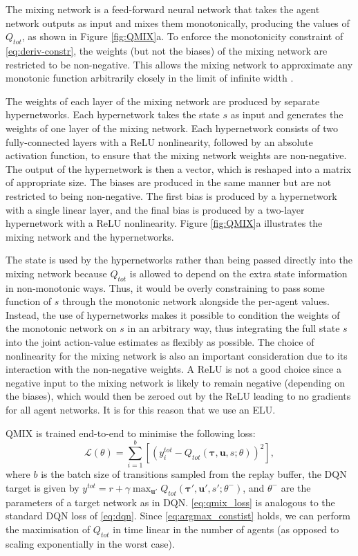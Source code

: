 \documentclass[twoside,11pt]{article}
\begin{document}
The mixing network is a feed-forward neural network that takes the agent 
network outputs as input and mixes them monotonically, producing the values of 
$Q_{tot}$, as shown in Figure \ref{fig:QMIX}a. To enforce the monotonicity 
constraint of \eqref{eq:deriv-constr}, the weights (but not the biases) of the 
mixing network are restricted to be non-negative. This allows the mixing 
network to approximate any monotonic function arbitrarily closely in the limit 
of infinite width \citep{Dugas_2009}.


The weights of each layer of the mixing network are produced by separate 
hypernetworks. Each hypernetwork takes the state $s$ as input and generates the 
weights of one layer of the mixing network. 
Each hypernetwork consists of two fully-connected layers with a ReLU nonlinearity, followed by an absolute activation function, to ensure 
that the mixing network weights are non-negative. The output of the 
hypernetwork is then a vector, which is reshaped into a matrix of appropriate 
size. 
The biases are produced in the same manner but are not restricted to 
being non-negative. 
The first bias is produced by a hypernetwork with a single linear layer, and the final bias is produced by a two-layer hypernetwork with a 
ReLU nonlinearity. Figure \ref{fig:QMIX}a illustrates the mixing network and 
the hypernetworks.

The state is used by the hypernetworks rather than being passed directly into the mixing network because $Q_{tot}$ is allowed to depend on the extra state 
information in non-monotonic ways. Thus, it would be overly constraining to pass some function of $s$ through the monotonic network alongside the 
per-agent values.
Instead, the use of hypernetworks makes it possible to condition the 
weights of the monotonic network on $s$ in an arbitrary way, thus 
integrating the full state $s$ into the joint action-value estimates as 
flexibly as possible.
The choice of nonlinearity for the mixing network is also an important consideration due to its interaction with the non-negative weights.
A ReLU is not a good choice since a negative input to the mixing network is likely to remain negative (depending on the biases), which would then be zeroed out by the ReLU leading to no gradients for all agent networks. 
It is for this reason that we use an ELU.


QMIX is trained end-to-end to minimise the following loss:
\begin{equation}\label{eq:qmix_loss}
\mathcal{L}(\theta)=\sum\limits_{i=1}^b\left[\left(y_i^{tot} - Q_{tot}(\boldsymbol{\tau}, \mathbf{u}, s; \theta) \right)^2\right],
\end{equation} 
where $b$ is the batch size of transitions sampled from the replay buffer, the DQN target is given by $y^{tot} = r+\gamma\max_{\mathbf{u}'} Q_{tot}(\boldsymbol{\tau}', \mathbf{u}', s'; \theta^-)$, and $\theta^-$ are the parameters of a target network as in DQN. \eqref{eq:qmix_loss} is analogous to the standard DQN loss of \eqref{eq:dqn}. Since \eqref{eq:argmax_constist} holds, we can perform the maximisation of $Q_{tot}$ in time linear in the number of agents (as opposed to scaling exponentially in the worst case). 
\end{document}
